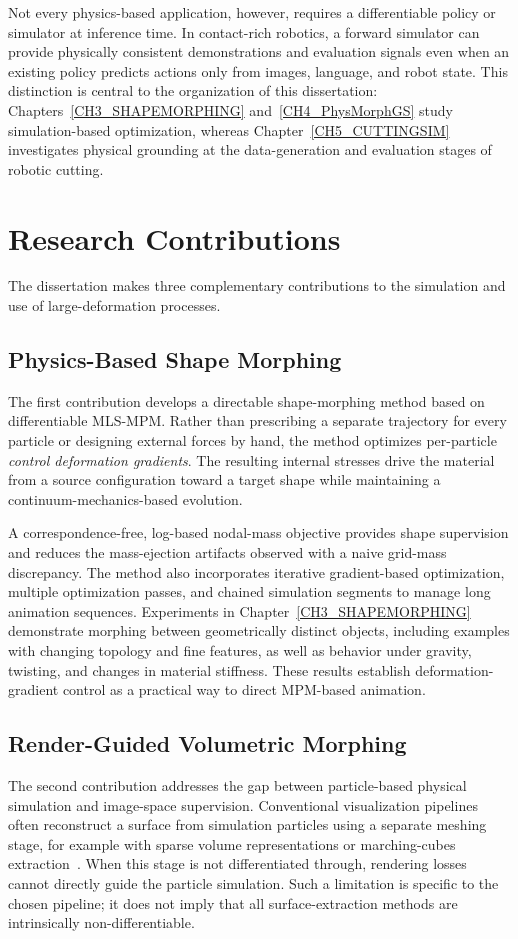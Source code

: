     Not every physics-based application, however, requires a differentiable policy or simulator at inference time. In contact-rich robotics, a forward simulator can provide physically consistent demonstrations and evaluation signals even when an existing policy predicts actions only from images, language, and robot state. This distinction is central to the organization of this dissertation: Chapters~\ref{CH3_SHAPEMORPHING} and~\ref{CH4_PhysMorphGS} study simulation-based optimization, whereas Chapter~\ref{CH5_CUTTINGSIM} investigates physical grounding at the data-generation and evaluation stages of robotic cutting.

\section{Research Contributions}
    The dissertation makes three complementary contributions to the simulation and use of large-deformation processes.

\subsection{Physics-Based Shape Morphing}
\label{sec:contrib_morphing}
    The first contribution develops a directable shape-morphing method based on differentiable MLS-MPM. Rather than prescribing a separate trajectory for every particle or designing external forces by hand, the method optimizes per-particle \emph{control deformation gradients}. The resulting internal stresses drive the material from a source configuration toward a target shape while maintaining a continuum-mechanics-based evolution.
    
    A correspondence-free, log-based nodal-mass objective provides shape supervision and reduces the mass-ejection artifacts observed with a naive grid-mass discrepancy. The method also incorporates iterative gradient-based optimization, multiple optimization passes, and chained simulation segments to manage long animation sequences. Experiments in Chapter~\ref{CH3_SHAPEMORPHING} demonstrate morphing between geometrically distinct objects, including examples with changing topology and fine features, as well as behavior under gravity, twisting, and changes in material stiffness. These results establish deformation-gradient control as a practical way to direct MPM-based animation.

\subsection{Render-Guided Volumetric Morphing}
\label{sec:contrib_bridge}
    The second contribution addresses the gap between particle-based physical simulation and image-space supervision. Conventional visualization pipelines often reconstruct a surface from simulation particles using a separate meshing stage, for example with sparse volume representations or marching-cubes extraction~\citep{10.1145/2487228.2487235,lorensen1998marching}. When this stage is not differentiated through, rendering losses cannot directly guide the particle simulation. Such a limitation is specific to the chosen pipeline; it does not imply that all surface-extraction methods are intrinsically non-differentiable.
    
